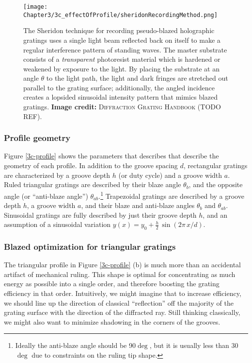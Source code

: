 \begin{figure}[htbp] %
   \centering
   \texttt{[image: Chapter3/3c\_effectOfProfile/sheridonRecordingMethod.png]}
   \caption{The Sheridon technique for recording pseudo-blazed holographic gratings uses a single light beam reflected back on itself to make a regular interference pattern of standing waves.  The master substrate consists of a \emph{transparent} photoresist material which is hardened or weakened by exposure to the light.  By placing the substrate at an angle $\theta$ to the light path, the light and dark fringes are stretched out parallel to the grating surface; additionally, the angled incidence creates a lopsided sinusoidal intensity pattern that mimics blazed gratings. \textbf{Image credit: }\textsc{Diffraction Grating Handbook} (TODO REF).}
   \label{3c-sheridon}
\end{figure}


\subsubsection{Profile geometry}
Figure \ref{3c-profile} shows the parameters that describes that describe the geometry of each profile.  In addition to the groove spacing $d$, rectangular gratings are characterized by a groove depth $h$ (or duty cycle) and a groove width $a$.  Ruled triangular gratings are described by their blaze angle $\theta_b$, and the opposite angle (or ``anti-blaze angle'') $\theta_{ab}$.\footnote{Ideally the anti-blaze angle should be 90$\deg$, but it is usually less than 30$\deg$ due to constraints on the ruling tip shape.}  Trapezoidal gratings are described by a groove depth $h$, a groove width $a$, and their blaze and anti-blaze angles $\theta_b$ and $\theta_{ab}$.  Sinusoidal gratings are fully described by just their groove depth $h$, and an assumption of a sinusoidal variation $y(x) = y_0 + \frac{h}{2}\, \sin(2\pi \,x / d)$.

\subsubsection{Blazed optimization for triangular gratings}
\label{blazeAngle}
The triangular profile in Figure \ref{3c-profile} (b) is much more than an accidental artifact of mechanical ruling.  This shape is optimal for concentrating as much energy as possible into a single order, and therefore boosting the grating efficiency in that order.  Intuitively, we might imagine that to increase efficiency, we should line up the direction of classical ``reflection'' off the majority of the grating surface with the direction of the diffracted ray.  Still thinking classically, we might also want to minimize shadowing in the corners of the grooves. 

